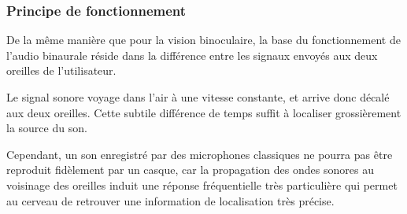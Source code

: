 \documentclass[a4,12pt]{scrartcl}
\begin{document}
\subsubsection{Principe de fonctionnement}

De la même manière que pour la vision binoculaire, la base du fonctionnement de l'audio binaurale réside dans la différence entre les signaux envoyés aux deux oreilles de l'utilisateur.

Le signal sonore voyage dans l'air à une vitesse constante, et arrive donc décalé aux deux oreilles. Cette subtile différence de temps suffit à localiser grossièrement la source du son.

Cependant, un son enregistré par des microphones classiques ne pourra pas être reproduit fidèlement par un casque, car la propagation des ondes sonores au voisinage des oreilles induit une réponse fréquentielle très particulière qui permet au cerveau de retrouver une information de localisation très précise.
\end{document}
